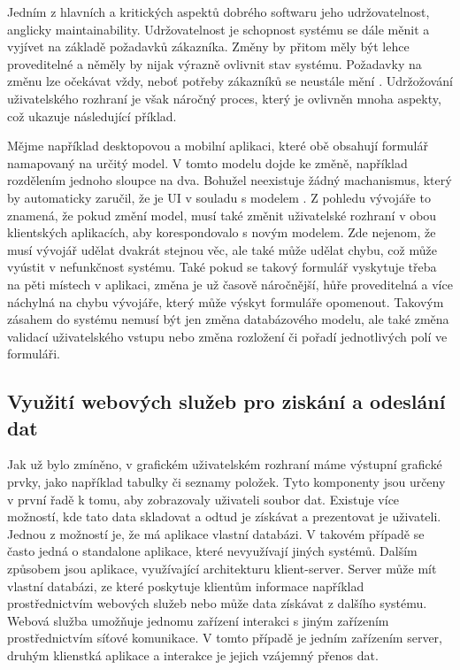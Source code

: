 Jedním z hlavních a kritických aspektů dobrého softwaru jeho udržovatelnost, anglicky maintainability. Udržovatelnost je schopnost systému se dále měnit a vyjívet na základě požadavků zákazníka. Změny by přitom měly být lehce proveditelné a něměly by nijak výrazně ovlivnit stav systému. Požadavky na změnu lze očekávat vždy, neboť potřeby zákazníků se neustále mění \cite{sommerville}. Udržožování uživatelského rozhraní je však náročný proces, který je ovlivněn mnoha aspekty, což ukazuje následující příklad.

Mějme například desktopovou a mobilní aplikaci, které obě obsahují formulář namapovaný na určitý model. V tomto modelu dojde ke změně, například rozdělením jednoho sloupce na dva. Bohužel neexistuje žádný machanismus, který by automaticky zaručil, že je UI v souladu s modelem \cite{cernyTEA}. Z pohledu vývojáře to znamená, že pokud změní model, musí také změnit uživatelské rozhraní v obou klientských aplikacích, aby korespondovalo s novým modelem. Zde nejenom, že musí vývojář udělat dvakrát stejnou věc, ale také může udělat chybu, což může vyústit v nefunkčnost systému. Také pokud se takový formulář vyskytuje třeba na pěti místech v aplikaci, změna je už časově náročnější, hůře proveditelná a více náchylná na chybu vývojáře, který může výskyt formuláře opomenout.
Takovým zásahem do systému nemusí být jen změna databázového modelu, ale také změna validací uživatelského vstupu nebo změna rozložení či pořadí jednotlivých polí ve formuláři.

\subsection{Využití webových služeb pro ziskání a odeslání dat}
Jak už bylo zmíněno, v grafickém uživatelském rozhraní máme výstupní grafické prvky, jako například tabulky či seznamy položek. Tyto komponenty jsou určeny v první řadě k tomu, aby zobrazovaly uživateli soubor dat. Existuje více možností, kde tato data skladovat a odtud je získávat a prezentovat je uživateli. Jednou z možností je, že má aplikace vlastní databázi. V takovém případě se často jedná o standalone aplikace, které nevyužívají jiných systémů. Dalším způsobem jsou aplikace, využívající architekturu klient-server. Server může mít vlastní databázi, ze které poskytuje klientům informace například prostřednictvím webových služeb nebo může data získávat z dalšího systému. Webová služba umožňuje jednomu zařízení interakci s jiným zařízením prostřednictvím síťové komunikace\cite{wiki-ws}. V tomto případě je jedním zařízením server, druhým klienstká aplikace a interakce je jejich vzájemný přenos dat. 

